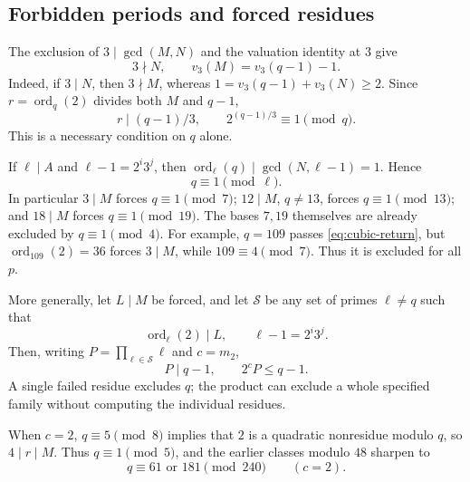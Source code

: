 \documentclass[11pt]{article}
\begin{document}
\subsection{Forbidden periods and forced residues}
\label{sec:forbidden-periods}
The exclusion of $3\mid\gcd(M,N)$ and the valuation identity at $3$
give
\[
3\nmid N,\qquad v_3(M)=v_3(q-1)-1.
\]
Indeed, if $3\mid N$, then $3\nmid M$, whereas
$1=v_3(q-1)+v_3(N)\ge2$.
Since $r=\operatorname{ord}_q(2)$ divides both $M$ and $q-1$,
\begin{equation}\label{eq:cubic-return}
\boxed{r\mid(q-1)/3,\qquad 2^{(q-1)/3}\equiv1\pmod q.}
\end{equation}
This is a necessary condition on $q$ alone.

If $\ell\mid A$ and $\ell-1=2^i3^j$, then
$\operatorname{ord}_\ell(q)\mid\gcd(N,\ell-1)=1$. Hence
\[
q\equiv1\pmod\ell.
\]
In particular $3\mid M$ forces $q\equiv1\pmod7$;
$12\mid M$, $q\ne13$, forces $q\equiv1\pmod{13}$;
and $18\mid M$ forces $q\equiv1\pmod{19}$.
The bases $7,19$ themselves are already excluded by $q\equiv1\pmod4$.
For example, $q=109$ passes \eqref{eq:cubic-return}, but
$\operatorname{ord}_{109}(2)=36$ forces $3\mid M$, while
$109\equiv4\pmod7$. Thus it is excluded for all $p$.

More generally, let $L\mid M$ be forced, and let $\mathcal S$ be
any set of primes $\ell\ne q$ such that
\[
\operatorname{ord}_\ell(2)\mid L,\qquad \ell-1=2^i3^j.
\]
Then, writing $P=\prod_{\ell\in\mathcal S}\ell$ and $c=m_2$,
\begin{equation}\label{eq:forced-residue-product}
\boxed{P\mid q-1,\qquad 2^cP\le q-1.}
\end{equation}
A single failed residue excludes $q$; the product can exclude a whole
specified family without computing the individual residues.

When $c=2$, $q\equiv5\pmod8$ implies that $2$ is a quadratic
nonresidue modulo $q$, so $4\mid r\mid M$. Thus $q\equiv1\pmod5$,
and the earlier classes modulo $48$ sharpen to
\[
q\equiv61\text{ or }181\pmod{240}\qquad(c=2).
\]
\end{document}
